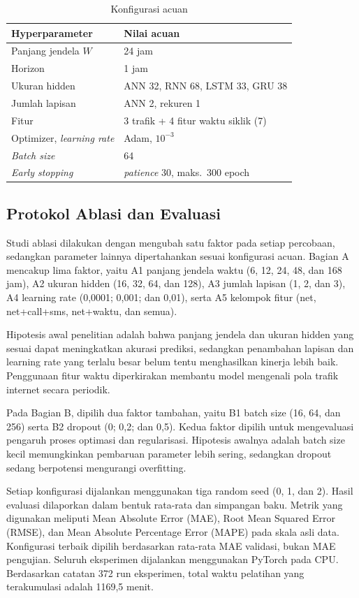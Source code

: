 \documentclass[conference,a4paper]{IEEEtran}
\begin{document}
\begin{table}[H]
  \centering
  \caption{Konfigurasi acuan}
  \label{tab:acuan}
  \begin{tabular}{@{}ll@{}}
    \toprule
    Hyperparameter & Nilai acuan \\
    \midrule
    Panjang jendela $W$ & 24 jam \\
    Horizon & 1 jam \\
    Ukuran hidden & ANN 32, RNN 68, LSTM 33, GRU 38 \\
    Jumlah lapisan & ANN 2, rekuren 1 \\
    Fitur & 3 trafik + 4 fitur waktu siklik (7) \\
    Optimizer, \textit{learning rate} & Adam, $10^{-3}$ \\
    \textit{Batch size} & 64 \\
    \textit{Early stopping} & \textit{patience} 30, maks.\ 300 epoch \\
    \bottomrule
  \end{tabular}
\end{table}

\subsection{Protokol Ablasi dan Evaluasi}
Studi ablasi dilakukan dengan mengubah satu faktor pada setiap percobaan, sedangkan parameter lainnya dipertahankan sesuai konfigurasi acuan. Bagian A mencakup lima faktor, yaitu A1 panjang jendela waktu (6, 12, 24, 48, dan 168 jam), A2 ukuran hidden (16, 32, 64, dan 128), A3 jumlah lapisan (1, 2, dan 3), A4 learning rate (0,0001; 0,001; dan 0,01), serta A5 kelompok fitur (net, net+call+sms, net+waktu, dan semua).

Hipotesis awal penelitian adalah bahwa panjang jendela dan ukuran hidden yang sesuai dapat meningkatkan akurasi prediksi, sedangkan penambahan lapisan dan learning rate yang terlalu besar belum tentu menghasilkan kinerja lebih baik. Penggunaan fitur waktu diperkirakan membantu model mengenali pola trafik internet secara periodik.

Pada Bagian B, dipilih dua faktor tambahan, yaitu B1 batch size (16, 64, dan 256) serta B2 dropout (0; 0,2; dan 0,5). Kedua faktor dipilih untuk mengevaluasi pengaruh proses optimasi dan regularisasi. Hipotesis awalnya adalah batch size kecil memungkinkan pembaruan parameter lebih sering, sedangkan dropout sedang berpotensi mengurangi overfitting.

Setiap konfigurasi dijalankan menggunakan tiga random seed (0, 1, dan 2). Hasil evaluasi dilaporkan dalam bentuk rata-rata dan simpangan baku. Metrik yang digunakan meliputi Mean Absolute Error (MAE), Root Mean Squared Error (RMSE), dan Mean Absolute Percentage Error (MAPE) pada skala asli data. Konfigurasi terbaik dipilih berdasarkan rata-rata MAE validasi, bukan MAE pengujian. Seluruh eksperimen dijalankan menggunakan PyTorch pada CPU. Berdasarkan catatan 372 run eksperimen, total waktu pelatihan yang terakumulasi adalah 1169,5 menit.
\end{document}
